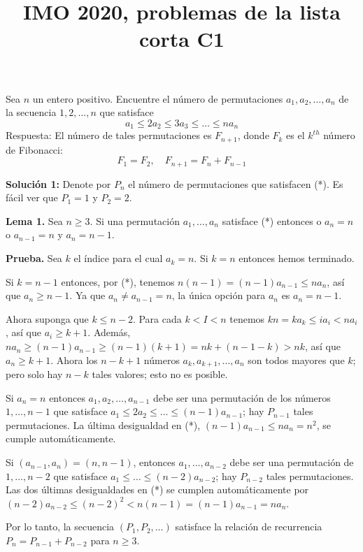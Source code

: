 \documentclass{article}
\title{IMO 2020, problemas de la lista corta C1}
\date{}
\begin{document}
\maketitle

Sea \( n \) un entero positivo. Encuentre el número de permutaciones \( a_1, a_2, \ldots, a_n \) de la secuencia \( 1, 2, \ldots, n \) que satisface
\[ a_1 \leq 2a_2 \leq 3a_3 \leq \ldots \leq n a_n \]
Respuesta: El número de tales permutaciones es \( F_{n+1} \), donde \( F_k \) es el \( k^{th} \) número de Fibonacci:
\[ F_1 = F_2, \quad F_{n+1} = F_n + F_{n-1} \]

\textbf{Solución 1:} Denote por \( P_n \) el número de permutaciones que satisfacen (*). Es fácil ver que \( P_1 = 1 \) y \( P_2 = 2 \).

\textbf{Lema 1.}  Sea \( n \geq 3 \). Si una permutación \( a_1, \ldots, a_n \) satisface (*) entonces o \( a_n = n \) o \( a_{n-1} = n \) y \( a_n = n-1 \).

\textbf{Prueba.} Sea \( k \) el índice para el cual \( a_k = n \). Si \( k = n \) entonces hemos terminado.

Si \( k = n - 1 \) entonces, por (*), tenemos \( n(n-1) = (n-1) a_{n-1} \leq n a_n \), así que \( a_n \geq n - 1 \). Ya que \( a_n \neq a_{n-1} = n \), la única opción para \( a_n \) es \( a_n = n - 1 \).

Ahora suponga que \( k \leq n - 2 \). Para cada \( k < I < n \) tenemos \( kn = k a_k \leq i a_i < n a_i \), así que \( a_i \geq k + 1 \). Además, \( n a_n \geq (n-1) a_{n-1} \geq (n-1)(k+1) = nk + (n-1-k) > nk \), así que \( a_n \geq k + 1 \). Ahora los \( n-k + 1 \) números \( a_k, a_{k+1}, \ldots, a_n \) son todos mayores que \( k \); pero solo hay \( n - k \) tales valores; esto no es posible.

Si \( a_n = n \) entonces \( a_1, a_2, \ldots, a_{n-1} \) debe ser una permutación de los números \( 1, \ldots, n - 1 \) que satisface \( a_1 \leq 2a_2 \leq \ldots \leq (n-1) a_{n-1} \); hay \( P_{n-1} \) tales permutaciones. La última desigualdad en (*), \( (n-1) a_{n-1} \leq n a_n = n^2 \), se cumple automáticamente.

Si \( (a_{n-1}, a_n) = (n, n-1) \), entonces \( a_1, \ldots, a_{n-2} \) debe ser una permutación de \( 1, \ldots, n - 2 \) que satisface \( a_1 \leq \ldots \leq (n-2) a_{n-2} \); hay \( P_{n-2} \) tales permutaciones. Las dos últimas desigualdades en (*) se cumplen automáticamente por \( (n-2) a_{n-2} \leq (n-2)^2 < n (n-1) = (n-1) a_{n-1} = n a_n \).

Por lo tanto, la secuencia \( (P_1, P_2, \ldots) \) satisface la relación de recurrencia \( P_n = P_{n-1} + P_{n-2} \) para \( n \geq 3 \).
\end{document}
